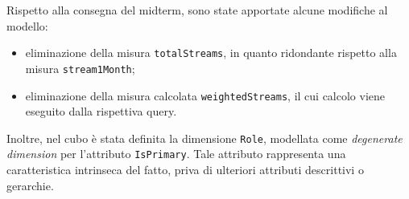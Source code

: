 Rispetto alla consegna del midterm, sono state apportate alcune
modifiche al modello:
\begin{itemize}
    \item eliminazione della misura \texttt{totalStreams},
    in quanto ridondante rispetto alla misura \texttt{stream1Month};
    \item eliminazione della misura calcolata \texttt{weightedStreams},
    il cui calcolo viene eseguito dalla rispettiva query.
\end{itemize}


Inoltre, nel cubo è stata definita la dimensione \texttt{Role},
modellata come \emph{degenerate dimension} per l'attributo
\texttt{IsPrimary}. Tale attributo rappresenta una caratteristica
intrinseca del fatto, priva di ulteriori attributi descrittivi o
gerarchie.